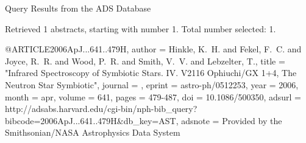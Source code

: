 Query Results from the ADS Database


Retrieved 1 abstracts, starting with number 1.  Total number selected: 1.

@ARTICLE{2006ApJ...641..479H,
   author = {{Hinkle}, K.~H. and {Fekel}, F.~C. and {Joyce}, R.~R. and {Wood}, P.~R. and 
	{Smith}, V.~V. and {Lebzelter}, T.},
    title = "{Infrared Spectroscopy of Symbiotic Stars. IV. V2116 Ophiuchi/GX 1+4, The Neutron Star Symbiotic}",
  journal = {\apj},
   eprint = {astro-ph/0512253},
     year = 2006,
    month = apr,
   volume = 641,
    pages = {479-487},
      doi = {10.1086/500350},
   adsurl = {http://adsabs.harvard.edu/cgi-bin/nph-bib_query?bibcode=2006ApJ...641..479H&db_key=AST},
  adsnote = {Provided by the Smithsonian/NASA Astrophysics Data System}
}


